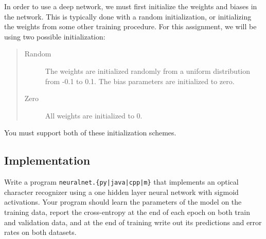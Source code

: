 \documentclass[11pt]{exam}
\numberwithin{equation}{section} %
\numberwithin{figure}{section} %
\numberwithin{table}{section} %
\begin{document}

In order to use a deep network, we must first initialize the weights and biases in the network. This is typically done with a random initialization, or initializing the weights from some other training procedure. For this assignment, we will be using two possible initialization: 
\begin{quote}
\begin{description}
\item[{\sc Random}] The weights are initialized randomly from a uniform distribution from -0.1 to 0.1. The bias parameters are initialized to zero.
\item[{\sc Zero}] All weights are initialized to 0.  
\end{description}
\end{quote}

You must support both of these initialization schemes.






\subsection{Implementation}
\label{sec:model}
Write a program \texttt{neuralnet.\{py|java|cpp|m\}} that implements an optical character recognizer using a one hidden layer neural network with sigmoid activations. Your program should learn the parameters of the model on the training data, report the cross-entropy at the end of each epoch on both train and validation data, and at the end of training write out its predictions and error rates on both datasets. 
%
\end{document}
